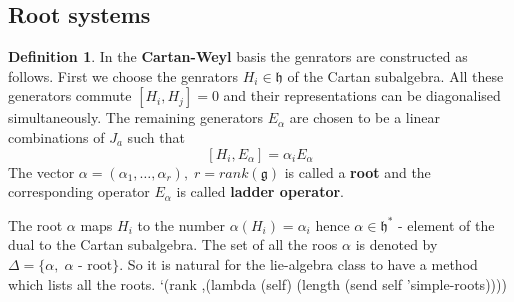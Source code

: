 \documentclass[a4paper,10pt]{article}%
\theoremstyle{definition} \newtheorem{Def}{Definition}
\begin{document}
\subsection{Root systems}
\label{sec:root-systems}
\begin{Def}
  In the {\bf Cartan-Weyl} basis the genrators are constructed as follows.
  First we choose the genrators $H_i\in \mathfrak{h}$ of the Cartan subalgebra. All these generators commute $[H_i,H_j]=0$ and their representations can be diagonalised simultaneously. The remaining generators $E_{\alpha}$ are chosen to be a linear combinations of $J_a$ such that
  \begin{equation}
    \label{eq:4}
    [H_i,E_{\alpha}]=\alpha_i E_{\alpha}
  \end{equation}
  The vector $\alpha=(\alpha_1,\dots,\alpha_r),\; r=rank(\mathfrak{g})$ is called a {\bf root} and the corresponding operator $E_{\alpha}$ is called {\bf ladder operator}.
\end{Def}
The root $\alpha$ maps $H_i$ to the number $\alpha(H_i)=\alpha_i$ hence $\alpha\in \mathfrak{h}^{*}$ - element of the dual to the Cartan subalgebra. The set of all the roos $\alpha$ is denoted by $\Delta=\{\alpha,\; \alpha \text{ - root}\}$. So it is natural for the {\Tt{}lie-algebra\nwendquote} class to have a method which lists all the roots.
\nwenddocs{}\endmoddef\nwstartdeflinemarkup{}\nwenddeflinemarkup
`(rank ,(lambda (self)
    (length (send self 'simple-roots))))
       
\end{document}
